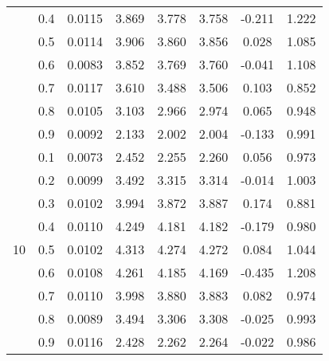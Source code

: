 \documentclass[11pt,a4paper]{report}
\begin{document}
\begin{longtable}{ | c | c || c | c | c | c | c | c | }
 & 0.4 & 0.0115 & 3.869 & 3.778 & 3.758 & -0.211 & 1.222 \\
 & 0.5 & 0.0114 & 3.906 & 3.860 & 3.856 & 0.028 & 1.085 \\
 & 0.6 & 0.0083 & 3.852 & 3.769 & 3.760 & -0.041 & 1.108 \\
 & 0.7 & 0.0117 & 3.610 & 3.488 & 3.506 & 0.103 & 0.852 \\
 & 0.8 & 0.0105 & 3.103 & 2.966 & 2.974 & 0.065 & 0.948 \\
 & 0.9 & 0.0092 & 2.133 & 2.002 & 2.004 & -0.133 & 0.991 \\
 \hline
\multirow{9}{*}{10} & 0.1 & 0.0073 & 2.452 & 2.255 & 2.260 & 0.056 & 0.973 \\
 & 0.2 & 0.0099 & 3.492 & 3.315 & 3.314 & -0.014 & 1.003 \\
 & 0.3 & 0.0102 & 3.994 & 3.872 & 3.887 & 0.174 & 0.881 \\
 & 0.4 & 0.0110 & 4.249 & 4.181 & 4.182 & -0.179 & 0.980 \\
 & 0.5 & 0.0102 & 4.313 & 4.274 & 4.272 & 0.084 & 1.044 \\
 & 0.6 & 0.0108 & 4.261 & 4.185 & 4.169 & -0.435 & 1.208 \\
 & 0.7 & 0.0110 & 3.998 & 3.880 & 3.883 & 0.082 & 0.974 \\
 & 0.8 & 0.0089 & 3.494 & 3.306 & 3.308 & -0.025 & 0.993 \\
 & 0.9 & 0.0116 & 2.428 & 2.262 & 2.264 & -0.022 & 0.986 \\
 \hline
\hline
\end{longtable}
\end{document}
